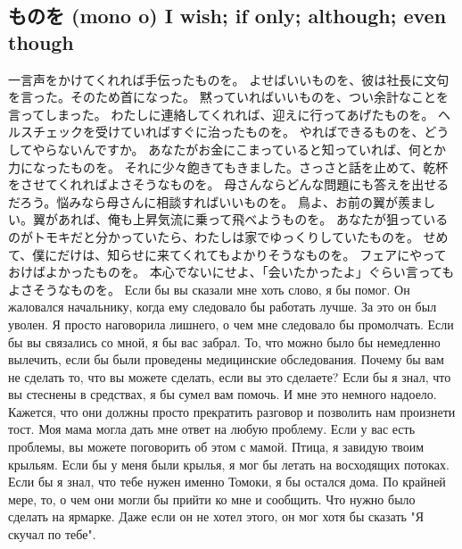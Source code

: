 \subsection{ものを (mono o)  I wish; if only; although; even though}

一言声をかけてくれれば手伝ったものを。
よせばいいものを、彼は社長に文句を言った。そのため首になった。
黙っていればいいものを、つい余計なことを言ってしまった。
わたしに連絡してくれれば、迎えに行ってあげたものを。
ヘルスチェックを受けていればすぐに治ったものを。
やればできるものを、どうしてやらないんですか。
あなたがお金にこまっていると知っていれば、何とか力になったものを。
それに少々飽きてもきました。さっさと話を止めて、乾杯をさせてくれればよさそうなものを。
母さんならどんな問題にも答えを出せるだろう。悩みなら母さんに相談すればいいものを。
鳥よ、お前の翼が羨ましい。翼があれば、俺も上昇気流に乗って飛べようものを。
あなたが狙っているのがトモキだと分かっていたら、わたしは家でゆっくりしていたものを。
せめて、僕にだけは、知らせに来てくれてもよかりそうなものを。
フェアにやっておけばよかったものを。
本心でないにせよ、「会いたかったよ」ぐらい言ってもよさそうなものを。
Если бы вы сказали мне хоть слово, я бы помог.
Он жаловался начальнику, когда ему следовало бы работать лучше. За это он был уволен.
Я просто наговорила лишнего, о чем мне следовало бы промолчать.
Если бы вы связались со мной, я бы вас забрал.
То, что можно было бы немедленно вылечить, если бы были проведены медицинские обследования.
Почему бы вам не сделать то, что вы можете сделать, если вы это сделаете?
Если бы я знал, что вы стеснены в средствах, я бы сумел вам помочь.
И мне это немного надоело. Кажется, что они должны просто прекратить разговор и позволить нам произнети тост.
Моя мама могла дать мне ответ на любую проблему. Если у вас есть проблемы, вы можете поговорить об этом с мамой.
Птица, я завидую твоим крыльям. Если бы у меня были крылья, я мог бы летать на восходящих потоках.
Если бы я знал, что тебе нужен именно Томоки, я бы остался дома.
По крайней мере, то, о чем они могли бы прийти ко мне и сообщить.
Что нужно было сделать на ярмарке.
Даже если он не хотел этого, он мог хотя бы сказать "Я скучал по тебе".